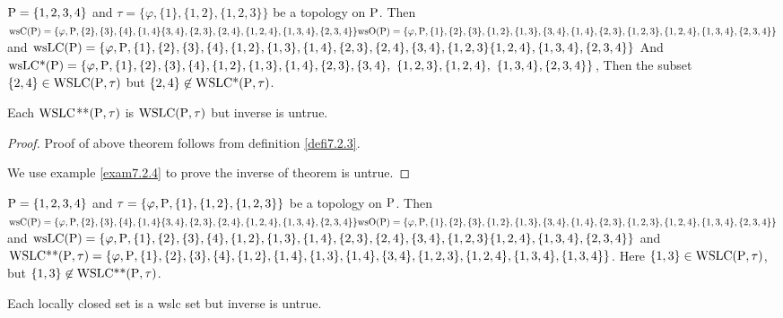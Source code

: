 \begin{exm}\label{exam7.2.3}
$\mathrm{P} = \{1, 2, 3, 4\}$ and $\tau = \{\varphi, \{1\},\{1, 2\}, \{1, 2, 3\}\}$ be a topology on $\mathrm{P}$. Then $\ws\TSC(\TSP) = \{\varphi, \TSP, \{2\}, \{3\}, \{4\},\{1, 4\} \{3,4\}, \{2,3\}, \{2,4\},\{1,2,4\},\{1,3,4\},\break \{2,3,4\}\} \ws\TSO(\TSP) = \{\varphi, \TSP, \{1\}, \{2\}, \{3\},\{1,2\}, \{1,3\},\{3,4\}, \{1,4\}, \{2,3\}, \{1,2,3\},\break \{1,2,4\},\{1,3,4\},\{2,3,4\}\}$ and $\ws\TSL\TSC(\TSP)= \{\varphi, \TSP ,\{1\}, \{2\}, \{3\},\{4\},\{1,2\},\{1,3\},\break \{1,4\},\{2,3\}, \{2,4\},\{3,4\}, \{1, 2, 3\}\{1,2,4\},\{1,3,4\},\{2,3,4\}\}$ And $\ws\TSL\TSC\text{*}(\TSP)=\break \{\varphi, \TSP ,\{1\},\{2\}, \{3\},\{4\},\{1,2\},\{1,3\}, \{1,4\}, \{2,3\},\{3,4\},~\{1, 2, 3\},\{1,2,4\},~\{1,3,4\},\break\{2,3,4\}\}$, Then the subset $\{2,4\} \in \mathrm{WSLC}(\mathrm{P}, \tau)$ but $\{2,4\}\not\in \mathrm{WSLC}\text{*}(\mathrm{P}, \tau)$.
\end{exm}

\begin{thm}\label{thm7.2.3}
Each $\mathrm{WSLC}${*}{*}$(\mathrm{P}, \tau)$ is $\mathrm{WSLC} (\mathrm{P}, \tau)$ but inverse is untrue.
\end{thm}

\begin{proof}
Proof of above theorem follows from definition \ref{defi7.2.3}.

We use example \ref{exam7.2.4} to prove the inverse of theorem is untrue.
\end{proof}

\begin{exm}\label{exam7.2.4}
$\mathrm{P} = \{1, 2, 3, 4\}$ and $\tau = \{\varphi, \mathrm{P}, \{1\},\{1, 2\}, \{1, 2, 3\}\}$ be a topology on $\mathrm{P}$. Then $\ws\TSC(\TSP) = \{\varphi, \TSP, \{2\}, \{3\}, \{4\},\{1, 4\} \{3,4\}, \{2,3\}, \{2,4\},\{1,2,4\},\{1,3,4\},\break\{2,3,4\}\} \ws\TSO(\TSP) = \{\varphi, \TSP, \{1\}, \{2\}, \{3\},\{1,2\}, \{1,3\},\{3,4\}, \{1,4\}, \{2,3\}, \{1,2,3\},\break \{1,2,4\},\{1,3,4\},\{2,3,4\}\}$ and $\ws\TSL\TSC(\TSP)= \{\varphi, \TSP ,\{1\}, \{2\}, \{3\},\{4\},\{1,2\},\{1,3\},\break \{1,4\}, \{2,3\}, \{2,4\},\{3,4\}, \{1, 2, 3\}\{1,2,4\},\{1,3,4\},\{2,3,4\}\}$ and $\WSLC\text{{*}{*}}(\TSP, \tau)= \{\varphi, \TSP,\{1\},\{2\}, \{3\},\{4\},\{1,2\},\{1,4\}, \{1,3\}, \{1,4\},\{3,4\}, \{1, 2, 3\},\{1,2,4\},\{1,3,4\},\break\{1,3,4\}\}$. Here $\{1,3\} \in \mathrm{WSLC} (\mathrm{P}, \tau)$, but $\{1, 3\}\not\in \mathrm{WSLC}\text{{*}{*}}(\mathrm{P}, \tau)$.
\end{exm}

\begin{thm}\label{thm7.2.4}
Each locally closed set is a wslc set but inverse is untrue.
\end{thm}

